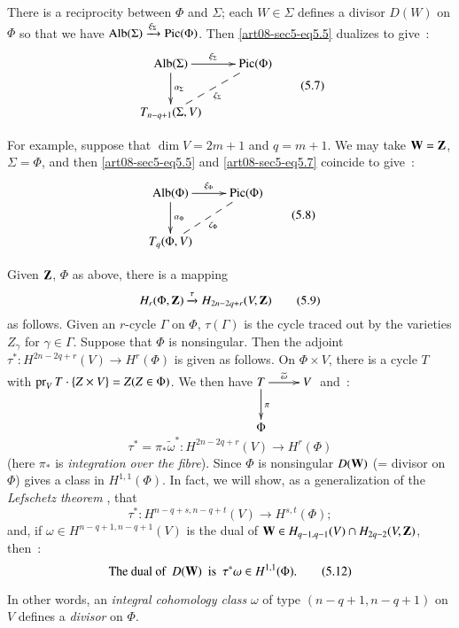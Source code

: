 \begin{remark*}
There is a reciprocity between $\Phi$ and $\Sigma$; each $W\in \Sigma$ defines a divisor $D(W)$ on $\Phi$ so that we have $\operatorname{\mathrm{Alb}}(\Sigma)\xrightarrow{\xi_{\Sigma}}\operatorname{\mathrm{Pic}}(\Phi)$. Then \eqref{art08-sec5-eq5.5} dualizes to give~:
\begin{equation*}
\vcenter{\xymatrix{
\Alb(\Sigma)\ar[r]^-{\xi_{\Sigma}}\ar[d]^{\alpha_{\Sigma}} & \Pic(\Phi)\\
T_{n-q+1}(\Sigma,V)\ar@{--}[ur]_{\zeta_{\Sigma}} &
}}\tag{5.7}\label{art08-sec5-eq5.7}
\end{equation*}

For example, suppose that $\dim V=2m+1$ and $q=m+1$. We may take $\mathbf{W}=\mathbf{Z}$, $\Sigma=\Phi$, and then \eqref{art08-sec5-eq5.5} and \eqref{art08-sec5-eq5.7} coincide to give~:
\begin{equation*}
\vcenter{\xymatrix{
\Alb(\Phi)\ar[r]^-{\xi_{\Phi}}\ar[d]^-{\alpha_{\Phi}} & \Pic(\Phi)\\
T_{q}(\Phi,V)\ar@{--}[ur]_-{\zeta_{\Phi}} & 
}}\tag{5.8}\label{art08-sec5-eq5.8}
\end{equation*}

Given $\mathbf{Z}$, $\Phi$ as above, there is a mapping
\begin{equation*}
H_{r}(\Phi,\mathbf{Z})\xrightarrow{\tau}H_{2n-2q+r}(V,\mathbf{Z})\tag{5.9}\label{art08-sec5-eq5.9}
\end{equation*}
as follows. Given an $r$-cycle $\Gamma$ on $\Phi$, $\tau(\Gamma)$ is the cycle traced out by the varieties $Z_{\gamma}$ for $\gamma\in \Gamma$. Suppose that $\Phi$ is nonsingular. Then the adjoint $\tau^{*}:H^{2n-2q+r}(V)\to H^{r}(\Phi)$ is given as follows. On $\Phi\times V$, there is a cycle $T$ with $\operatorname{\mathrm{pr}}_{V}T\cdot\{Z\times V\}=Z(Z\in \Phi)$. We then have\pageoriginale $\xymatrix{T\ar[d]^{\pi}\ar[r]^-{\widetilde{\omega}} & V\\ \Phi &}$ and~:
\begin{equation*}
\tau^{*}=\pi_{*}\widetilde{\omega}^{*}:H^{2n-2q+r}(V)\to H^{r}(\Phi)\tag{5.10}\label{art08-sec5-eq5.10}
\end{equation*}
(here $\pi_{*}$ is {\em integration over the fibre}). Since $\Phi$ is nonsingular $D(\mathbf{W})$ (= divisor on $\Phi$) gives a class in $H^{1,1}(\Phi)$. In fact, we will show, as a generalization of the {\em Lefschetz theorem} \cite{art08-key19}, that
\begin{equation*}
\tau^{*}:H^{n-q+s,n-q+t}(V)\to H^{s,t}(\Phi);\tag{5.11}\label{art08-sec5-eq5.11}
\end{equation*}
and, if $\omega\in H^{n-q+1,n-q+1}(V)$ is the dual of $\bfW\in H_{q-1,q-1}(V)\cap H_{2q-2}\break (V,\bfZ)$, then~:
\begin{equation*}
\text{The dual of~ } D(\mathbf{W})\text{~ is ~} \tau^{*}\omega\in H^{1,1}(\Phi).\tag{5.12}\label{art08-sec5-eq5.12}
\end{equation*}

In other words, an {\em integral cohomology class} $\omega$ of type $(n-q+1, n-q+1)$ on $V$ defines a {\em divisor} on $\Phi$.
\end{remark*}


